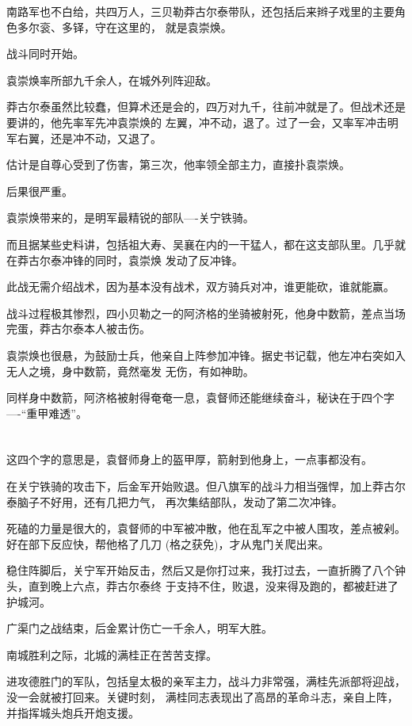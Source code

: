 \documentclass[11pt,a4paper,onecolumn]{article}
\begin{document}
南路军也不白给，共四万人，三贝勒莽古尔泰带队，还包括后来辫子戏里的主要角色多尔衮、多铎，守在这里的，
就是袁崇焕。

战斗同时开始。

袁崇焕率所部九千余人，在城外列阵迎敌。

莽古尔泰虽然比较蠢，但算术还是会的，四万对九千，往前冲就是了。但战术还是要讲的，他先率军先冲袁崇焕的
左翼，冲不动，退了。过了一会，又率军冲击明军右翼，还是冲不动，又退了。

估计是自尊心受到了伤害，第三次，他率领全部主力，直接扑袁崇焕。

后果很严重。

袁崇焕带来的，是明军最精锐的部队----关宁铁骑。

而且据某些史料讲，包括祖大寿、吴襄在内的一干猛人，都在这支部队里。几乎就在莽古尔泰冲锋的同时，袁崇焕
发动了反冲锋。

此战无需介绍战术，因为基本没有战术，双方骑兵对冲，谁更能砍，谁就能赢。

战斗过程极其惨烈，四小贝勒之一的阿济格的坐骑被射死，他身中数箭，差点当场完蛋，莽古尔泰本人被击伤。

袁崇焕也很悬，为鼓励士兵，他亲自上阵参加冲锋。据史书记载，他左冲右突如入无人之境，身中数箭，竟然毫发
无伤，有如神助。

同样身中数箭，阿济格被射得奄奄一息，袁督师还能继续奋斗，秘诀在于四个字----``重甲难透''。

\section[\thesection]{}

这四个字的意思是，袁督师身上的盔甲厚，箭射到他身上，一点事都没有。

在关宁铁骑的攻击下，后金军开始败退。但八旗军的战斗力相当强悍，加上莽古尔泰脑子不好用，还有几把力气，
再次集结部队，发动了第二次冲锋。

死磕的力量是很大的，袁督师的中军被冲散，他在乱军之中被人围攻，差点被剁。好在部下反应快，帮他格了几刀
(格之获免)，才从鬼门关爬出来。

稳住阵脚后，关宁军开始反击，然后又是你打过来，我打过去，一直折腾了八个钟头，直到晚上六点，莽古尔泰终
于支持不住，败退，没来得及跑的，都被赶进了护城河。

广渠门之战结束，后金累计伤亡一千余人，明军大胜。

南城胜利之际，北城的满桂正在苦苦支撑。

进攻德胜门的军队，包括皇太极的亲军主力，战斗力非常强，满桂先派部将迎战，没一会就被打回来。关键时刻，
满桂同志表现出了高昂的革命斗志，亲自上阵，并指挥城头炮兵开炮支援。
\end{document}
